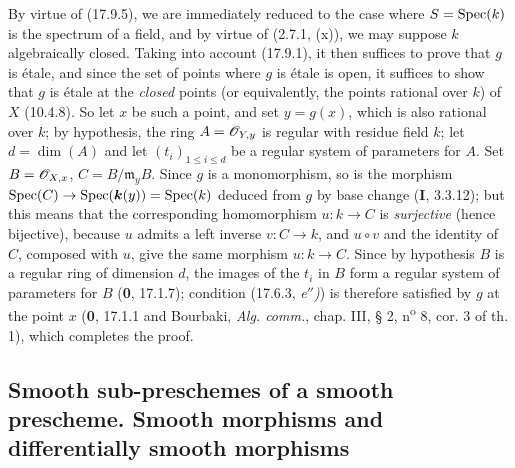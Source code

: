 By virtue of (17.9.5), we are immediately reduced to the case where $S=\operatorname{Spec}(k)$ is the spectrum of a field, and by virtue of (2.7.1, (x)), we may suppose $k$ algebraically closed. Taking into account (17.9.1), it then suffices to prove that $g$ is étale, and since the set of points where $g$ is étale is open, it suffices to show that $g$ is étale at the \emph{closed} points (or equivalently, the points rational over $k$) of $X$ (10.4.8). So let $x$ be such a point, and set $y=g(x)$, which is also rational over $k$; by hypothesis, the ring $A=\mathscr{O}_{Y,y}$ is regular with residue field $k$; let $d=\dim(A)$ and let $(t_i)_{1\leq i\leq d}$ be a regular system of parameters for $A$. Set $B=\mathscr{O}_{X,x}$, $C=B/\mathfrak m_yB$. Since $g$ is a monomorphism, so is the morphism $\operatorname{Spec}(C)\to\operatorname{Spec}(\boldsymbol{k}(y))=\operatorname{Spec}(k)$ deduced from $g$ by base change (\textbf{I}, 3.3.12); but this means that the corresponding homomorphism $u:k\to C$ is \emph{surjective} (hence bijective), because $u$ admits a left inverse $v:C\to k$, and $u\circ v$ and the identity of $C$, composed with $u$, give the same morphism $u:k\to C$. Since by hypothesis $B$ is a regular ring of dimension $d$, the images of the $t_i$ in $B$ form a regular system of parameters for $B$ (\textbf{0}, 17.1.7); condition (17.6.3, \emph{e$''$)}) is therefore satisfied by $g$ at the point $x$ (\textbf{0}, 17.1.1 and Bourbaki, \emph{Alg. comm.}, chap. III, § 2, n\textsuperscript{o} 8, cor. 3 of th. 1), which completes the proof.

\subsection{Smooth sub-preschemes of a smooth prescheme. Smooth morphisms and differentially smooth morphisms}

